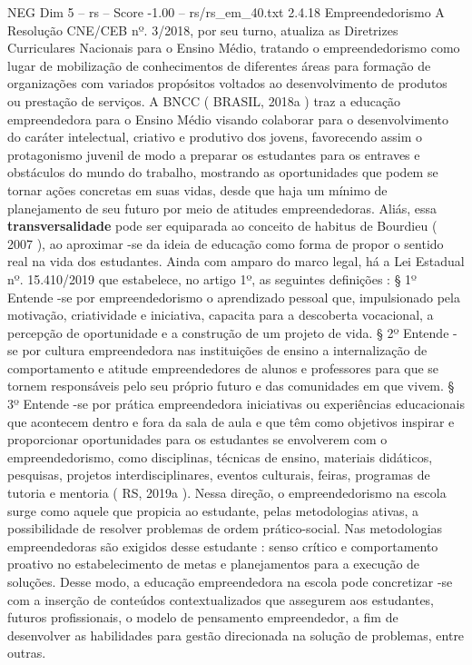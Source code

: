 \begin{textsample}{NEG Dim 5 – rs – Score -1.00 – rs/rs\_em\_40.txt}  \label{ex:f5_neg_030}
2.4.18 Empreendedorismo A Resolução CNE/CEB nº. 3/2018, por seu turno, atualiza as Diretrizes Curriculares Nacionais para o Ensino Médio, tratando o empreendedorismo como lugar de mobilização de conhecimentos de diferentes áreas para formação de organizações com variados propósitos voltados ao desenvolvimento de produtos ou prestação de serviços.
A BNCC ( BRASIL, 2018a ) traz a educação empreendedora para o Ensino Médio visando colaborar para o desenvolvimento do caráter intelectual, criativo e produtivo dos jovens, favorecendo assim o protagonismo juvenil de modo a preparar os estudantes para os entraves e obstáculos do mundo do trabalho, mostrando as oportunidades que podem se tornar ações concretas em suas vidas, desde que haja um mínimo de planejamento de seu futuro por meio de atitudes empreendedoras.
Aliás, essa \textbf{transversalidade} pode ser equiparada ao conceito de habitus de Bourdieu ( 2007 ), ao aproximar -se da ideia de educação como forma de propor o sentido real na vida dos estudantes.
Ainda com amparo do marco legal, há a Lei Estadual nº. 15.410/2019 que estabelece, no artigo 1º, as seguintes definições : § 1º Entende -se por empreendedorismo o aprendizado pessoal que, impulsionado pela motivação, criatividade e iniciativa, capacita para a descoberta vocacional, a percepção de oportunidade e a construção de um projeto de vida. § 2º Entende -se por cultura empreendedora nas instituições de ensino a internalização de comportamento e atitude empreendedores de alunos e professores para que se tornem responsáveis pelo seu próprio futuro e das comunidades em que vivem. § 3º Entende -se por prática empreendedora iniciativas ou experiências educacionais que acontecem dentro e fora da sala de aula e que têm como objetivos inspirar e proporcionar oportunidades para os estudantes se envolverem com o empreendedorismo, como disciplinas, técnicas de ensino, materiais didáticos, pesquisas, projetos interdisciplinares, eventos culturais, feiras, programas de tutoria e mentoria ( RS, 2019a ).
Nessa direção, o empreendedorismo na escola surge como aquele que propicia ao estudante, pelas metodologias ativas, a possibilidade de resolver problemas de ordem prático-social.
Nas metodologias empreendedoras são exigidos desse estudante : senso crítico e comportamento proativo no estabelecimento de metas e planejamentos para a execução de soluções.
Desse modo, a educação empreendedora na escola pode concretizar -se com a inserção de conteúdos contextualizados que assegurem aos estudantes, futuros profissionais, o modelo de pensamento empreendedor, a fim de desenvolver as habilidades para gestão direcionada na solução de problemas, entre outras.

\end{textsample}
